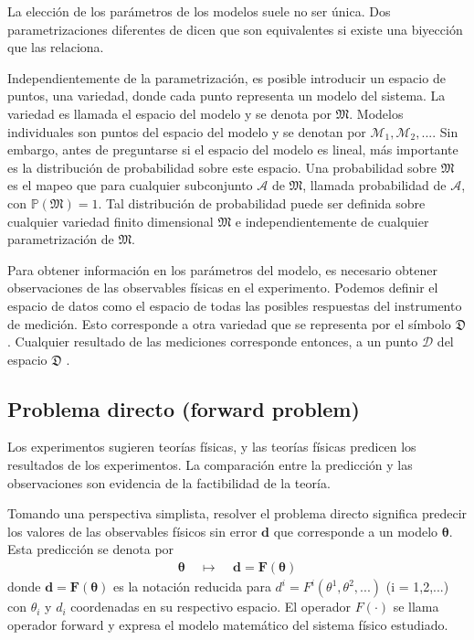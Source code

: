 \documentclass{article}
\begin{document}
La elección de los parámetros de los modelos suele no ser única. Dos parametrizaciones diferentes de dicen que son equivalentes si existe una biyección que las relaciona.

Independientemente de la parametrización, es posible introducir un espacio de puntos, una variedad, donde cada punto representa un modelo del sistema. La variedad es llamada el espacio del modelo y se denota por $\mathfrak{M}$. Modelos individuales son puntos del espacio del modelo y se denotan por $\mathscr{M}_1, \mathscr{M}_2, ...$. Sin embargo, antes de preguntarse si el espacio del modelo es lineal, más importante es la distribución de probabilidad sobre este espacio. Una probabilidad sobre $\mathfrak{M}$ es el mapeo que para cualquier subconjunto $\mathcal{A}$ de $\mathfrak{M}$, llamada probabilidad de $\mathcal{A}$, con $\mathbb{P}\left (\mathfrak{M} \right ) = 1 $. Tal distribución de probabilidad puede ser definida sobre cualquier variedad finito dimensional $\mathfrak{M}$ e independientemente de cualquier parametrización de $\mathfrak{M}$.

Para obtener información en los parámetros del modelo, es necesario obtener observaciones de las observables físicas en el experimento. Podemos definir el espacio de datos como el espacio de todas las posibles respuestas del instrumento de medición. Esto corresponde a otra variedad que se representa por el símbolo $\mathfrak{D}$. Cualquier resultado de las mediciones corresponde entonces, a un punto $\mathscr{D}$ del espacio $\mathfrak{D}$ \cite{tarantola2005inverse}.



\subsection{Problema directo (forward problem)}

Los experimentos sugieren teorías físicas, y las teorías físicas predicen los resultados de los experimentos. La comparación entre la predicción y las observaciones son evidencia de la factibilidad de la teoría.

Tomando una perspectiva simplista, resolver el problema directo significa predecir los valores de las observables físicos sin error $\mathbf{d}$ que corresponde a un modelo $\boldsymbol{\theta}$. Esta predicción se denota por 
\begin{align*}
    \boldsymbol{\theta} \:\:\:\:\: \mapsto \:\:\:\:\: \mathbf{d} = \mathbf{F(\boldsymbol{\theta})}
\end{align*}
donde $\mathbf{d} = \mathbf{F(\boldsymbol{\theta})} $ es la notación reducida para $ d ^i = F^i(\theta^1,\theta^2,...)$ (i = 1,2,...) con $\theta_i$ y $d_i$ coordenadas en su respectivo espacio. El operador $F(\cdot) $ se llama operador forward y expresa el modelo matemático del sistema físico estudiado.
\end{document}
